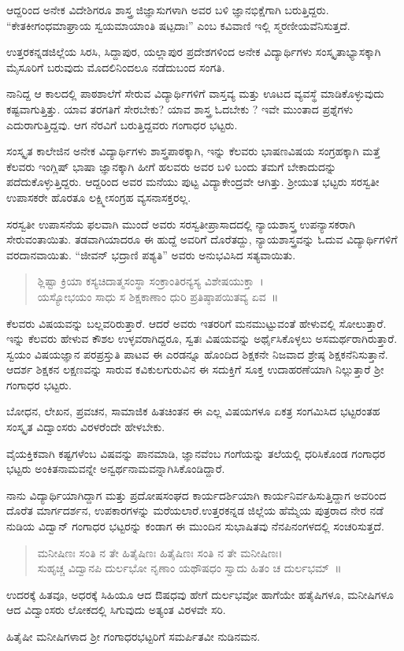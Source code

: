 {ಆದ್ದರಿಂದ ಅನೇಕ ವಿದೇಶಿಗರೂ ಶಾಸ್ತ್ರ ಜಿಜ್ಞಾಸುಗಳಾಗಿ ಅವರ ಬಳಿ ಜ್ಞಾನಭಿಕ್ಷೆಗಾಗಿ ಬರುತ್ತಿದ್ದರು. “ಕೇತಕೀಗಂಧಮಾಘ್ರಾಯ ಸ್ವಯಮಾಯಾಂತಿ ಷಟ್ಪದಾಃ” ಎಂಬ ಕವಿವಾಣಿ ಇಲ್ಲಿ ಸ್ಮರಣೀಯವೆನಿಸುತ್ತದೆ.

ಉತ್ತರಕನ್ನಡಜಿಲ್ಲೆಯ ಸಿರಸಿ, ಸಿದ್ದಾಪುರ, ಯಲ್ಲಾಪುರ ಪ್ರದೇಶಗಳಿಂದ ಅನೇಕ ವಿದ್ಯಾರ್ಥಿಗಳು ಸಂಸ್ಕೃತಾಭ್ಯಾಸಕ್ಕಾಗಿ ಮೈಸೂರಿಗೆ ಬರುವುದು ಮೊದಲಿನಿಂದಲೂ ನಡೆದುಬಂದ ಸಂಗತಿ. 

ನಾನಿದ್ದ ಆ ಕಾಲದಲ್ಲಿ ಪಾಠಶಾಲೆಗೆ ಸೇರುವ ವಿದ್ಯಾರ್ಥಿಗಳಿಗೆ ವಾಸ್ತವ್ಯ ಮತ್ತು ಊಟದ ವ್ಯವಸ್ಥೆ ಮಾಡಿಕೊಳ್ಳುವುದು ಕಷ್ಟವಾಗುತ್ತಿತ್ತು. ಯಾವ ತರಗತಿಗೆ ಸೇರಬೇಕು? ಯಾವ ಶಾಸ್ತ್ರ ಓದಬೇಕು ? ಇವೇ ಮುಂತಾದ ಪ್ರಶ್ನೆಗಳು ಎದುರಾಗುತ್ತಿದ್ದವು. ಆಗ ನೆರವಿಗೆ ಬರುತ್ತಿದ್ದವರು ಗಂಗಾಧರ ಭಟ್ಟರು.

ಸಂಸ್ಕೃತ ಕಾಲೇಜಿನ ಅನೇಕ ವಿದ್ಯಾರ್ಥಿಗಳು ಶಾಸ್ತ್ರಪಾಠಕ್ಕಾಗಿ, ಇನ್ನು ಕೆಲವರು ಭಾಷಣವಿಷಯ ಸಂಗ್ರಹಕ್ಕಾಗಿ ಮತ್ತೆ ಕೆಲವರು ಇಂಗ್ಲಿಷ್ ಭಾಷಾ ಜ್ಞಾನಕ್ಕಾಗಿ ಹೀಗೆ ಹಲವರು ಅವರ ಬಳಿ ಬಂದು ತಮಗೆ ಬೇಕಾದುದನ್ನು ಪದೆದುಕೊಳ್ಳುತ್ತಿದ್ದರು. ಆದ್ದರಿಂದ ಅವರ ಮನೆಯು ಪುಟ್ಟ ವಿದ್ಯಾಕೇಂದ್ರವೇ ಆಗಿತ್ತು. ಶ್ರೀಯುತ ಭಟ್ಟರು ಸರಸ್ವತೀ ಉಪಾಸಕರೇ ಹೊರತೂ ಲಕ್ಷ್ಮೀಸಂಗ್ರಹ  \enginline{-}  ವ್ಯಸನಾಸಕ್ತರಲ್ಲ.

ಸರಸ್ವತೀ ಉಪಾಸನೆಯ ಫಲವಾಗಿ ಮುಂದೆ ಅವರು ಸರಸ್ವತೀಪ್ರಾಸಾದದಲ್ಲಿ ನ್ಯಾಯಶಾಸ್ತ್ರ ಉಪನ್ಯಾಸಕರಾಗಿ ಸೇರುವಂತಾಯಿತು. ತಡವಾಗಿಯಾದರೂ ಈ ಹುದ್ದೆ ಅವರಿಗೆ ದೊರೆತದ್ದು, ನ್ಯಾಯಶಾಸ್ತ್ರವನ್ನು ಓದುವ ವಿದ್ಯಾರ್ಥಿಗಳಿಗೆ ವರದಾನವಾಯಿತು. “ಜೀವನ್ ಭದ್ರಾಣಿ ಪಶ್ಯತಿ” ಅವರು ಅನುಭವಿಸಿದ ಸತ್ಯವಾಯಿತು.
\begin{verse}
ಶ್ಲಿಷ್ಟಾ ಕ್ರಿಯಾ ಕಸ್ಯಚಿದಾತ್ಮಸಂಸ್ಥಾ ಸಂಕ್ರಾಂತಿರನ್ಯಸ್ಯ ವಿಶೇಷಯುಕ್ತಾ~।\\
ಯಸ್ಯೋಭಯಂ ಸಾಧು ಸ ಶಿಕ್ಷಕಾಣಾಂ ಧುರಿ ಪ್ರತಿಷ್ಠಾಪಯಿತವ್ಯ ಏವ~॥
\end{verse}
ಕೆಲವರು ವಿಷಯವನ್ನು ಬಲ್ಲವರಿರುತ್ತಾರೆ. ಆದರೆ ಅವರು ಇತರರಿಗೆ ಮನಮುಟ್ಟುವಂತೆ ಹೇಳುವಲ್ಲಿ ಸೋಲುತ್ತಾರೆ. ಇನ್ನು ಕೆಲವರು ಹೇಳುವ ಕೌಶಲ ಉಳ್ಳವರಾಗಿದ್ದರೂ, ಸ್ವತಃ ವಿಷಯವನ್ನು ಅರ್ಥೈಸಿಕೊಳ್ಳಲು ಅಸಮರ್ಥರಾಗಿರುತ್ತಾರೆ. ಸ್ವಯಂ ವಿಷಯಜ್ಞಾನ   \enginline{-}   ಪರಪ್ರಸ್ತುತಿ ಪಾಟವ ಈ ಎರಡನ್ನೂ ಹೊಂದಿದ ಶಿಕ್ಷಕನೇ ನಿಜವಾದ ಶ್ರೇಷ್ಠ ಶಿಕ್ಷಕನೆನಿಸುತ್ತಾನೆ. ಆದರ್ಶ ಶಿಕ್ಷಕನ ಲಕ್ಷಣವನ್ನು ಸಾರುವ ಕವಿಕುಲಗುರುವಿನ ಈ ಸದುಕ್ತಿಗೆ ಸೂಕ್ತ ಉದಾಹರಣೆಯಾಗಿ ನಿಲ್ಲುತ್ತಾರೆ ಶ್ರೀ ಗಂಗಾಧರ ಭಟ್ಟರು.

ಬೋಧನ, ಲೇಖನ, ಪ್ರವಚನ, ಸಾಮಾಜಿಕ ಹಿತಚಿಂತನ ಈ ಎಲ್ಲ ವಿಷಯಗಳೂ ಏಕತ್ರ ಸಂಗಮಿಸಿದ ಭಟ್ಟರಂತಹ ಸಂಸ್ಕೃತ ವಿದ್ವಾಂಸರು ವಿರಳರೆಂದೇ ಹೇಳಬೇಕು. 

ವೈಯಕ್ತಿಕವಾಗಿ ಕಷ್ಟಗಳೆಂಬ ವಿಷವನ್ನು ಪಾನಮಾಡಿ, ಜ್ಞಾನವೆಂಬ ಗಂಗೆಯನ್ನು ತಲೆಯಲ್ಲಿ ಧರಿಸಿಕೊಂಡ ಗಂಗಾಧರ ಭಟ್ಟರು ಅಂಕಿತನಾಮವನ್ನೇ ಅನ್ವರ್ಥನಾಮವನ್ನಾಗಿಸಿಕೊಂಡಿದ್ದಾರೆ.

ನಾನು ವಿದ್ಯಾರ್ಥಿಯಾಗಿದ್ದಾಗ ಮತ್ತು ಪ್ರದೋಷಸಂಘದ ಕಾರ್ಯದರ್ಶಿಯಾಗಿ ಕಾರ್ಯನಿರ್ವಹಿಸುತ್ತಿದ್ದಾಗ ಅವರಿಂದ ದೊರೆತ ಮಾರ್ಗದರ್ಶನ, ಉಪಕಾರಗಳನ್ನು ಮರೆಯಲಾರೆ.ಉತ್ತರಕನ್ನಡ ಜಿಲ್ಲೆಯ ಹೆಮ್ಮೆಯ ಪುತ್ರರಾದ ನೇರ ನಡೆ ನುಡಿಯ ವಿದ್ವಾನ್ ಗಂಗಾಧರ ಭಟ್ಟರನ್ನು ಕಂಡಾಗ ಈ ಮುಂದಿನ ಸುಭಾಷಿತವು ನೆನಪಿನಂಗಳದಲ್ಲಿ ಸಂಚರಿಸುತ್ತದೆ.
\begin{verse}
ಮನೀಷಿಣಃ ಸಂತಿ ನ ತೇ ಹಿತೈಷಿಣಃ ಹಿತೈಷಿಣಃ ಸಂತಿ ನ ತೇ ಮನೀಷಿಣಃ।\\
ಸುಹೃಚ್ಚ ವಿದ್ವಾನಪಿ ದುರ್ಲಭೋ ನೃಣಾಂ ಯಥೌಷಧಂ ಸ್ವಾದು ಹಿತಂ ಚ ದುರ್ಲಭಮ್~॥
\end{verse}
ಉದರಕ್ಕೆ ಹಿತವೂ, ಅಧರಕ್ಕೆ ಸಿಹಿಯೂ ಆದ ಔಷಧವು ಹೇಗೆ ದುರ್ಲಭವೋ ಹಾಗೆಯೇ ಹತೈಷಿಗಳೂ, ಮನೀಷಿಗಳೂ ಆದ ವಿದ್ವಾಂಸರು ಲೋಕದಲ್ಲಿ ಸಿಗುವುದು ಅತ್ಯಂತ ವಿರಳವೇ ಸರಿ. 

ಹಿತೈಷೀ ಮನೀಷಿಗಳಾದ ಶ್ರೀ ಗಂಗಾಧರಭಟ್ಟರಿಗೆ ಸಮರ್ಪಿತವೀ ನುಡಿನಮನ.

\articleend
}
